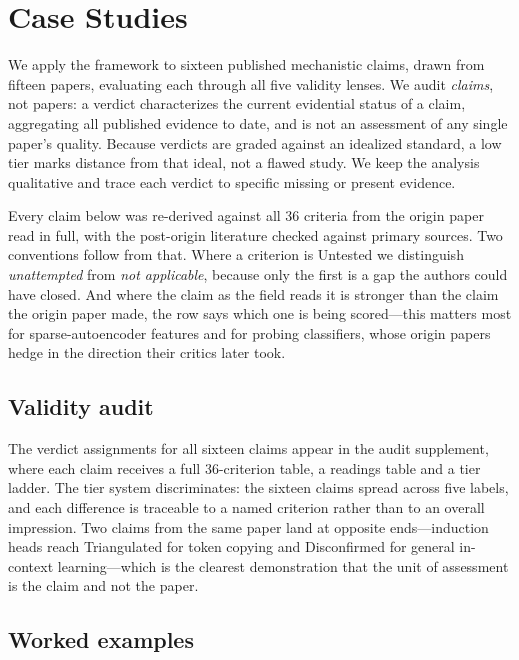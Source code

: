\documentclass{article}
\begin{document}
\section{Case Studies}
\label{sec:case-studies}

We apply the framework to sixteen published mechanistic claims, drawn from fifteen papers, evaluating each through all five validity lenses. We audit \emph{claims}, not papers: a verdict characterizes the current evidential status of a claim, aggregating all published evidence to date, and is not an assessment of any single paper's quality. Because verdicts are graded against an idealized standard, a low tier marks distance from that ideal, not a flawed study. We keep the analysis qualitative and trace each verdict to specific missing or present evidence.

Every claim below was re-derived against all 36 criteria from the origin paper read in full, with the post-origin literature checked against primary sources. Two conventions follow from that. Where a criterion is Untested we distinguish \emph{unattempted} from \emph{not applicable}, because only the first is a gap the authors could have closed. And where the claim as the field reads it is stronger than the claim the origin paper made, the row says which one is being scored---this matters most for sparse-autoencoder features and for probing classifiers, whose origin papers hedge in the direction their critics later took.

\subsection{Validity audit}

The verdict assignments for all sixteen claims appear in the audit supplement, where each claim receives a full 36-criterion table, a readings table and a tier ladder. The tier system discriminates: the sixteen claims spread across five labels, and each difference is traceable to a named criterion rather than to an overall impression. Two claims from the same paper land at opposite ends---induction heads reach Triangulated for token copying and Disconfirmed for general in-context learning---which is the clearest demonstration that the unit of assessment is the claim and not the paper.


\subsection{Worked examples}
\end{document}
